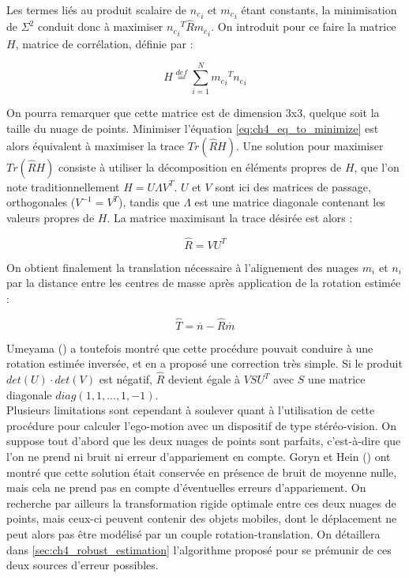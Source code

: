 Les termes liés au produit scalaire de ${n_c}_i$ et ${m_c}_i$ étant constants, la minimisation de $\Sigma^2$ conduit donc à maximiser ${{n_c}_i}^T \hat{R} {m_c}_i$. On introduit pour ce faire la matrice $H$, matrice de corrélation, définie par :

\begin{equation}
H \stackrel{def}{=} \sum\limits_{i=1}^{N} {{m_c}_i}^T {n_c}_i
\end{equation}

On pourra remarquer que cette matrice est de dimension 3x3, quelque soit la taille du nuage de points. Minimiser l'équation \ref{eq:ch4_eq_to_minimize} est alors équivalent à maximiser la trace $Tr(\hat{R} H)$. Une solution pour maximiser $Tr(\hat{R} H)$ consiste à utiliser la décomposition en éléments propres de $H$, que l'on note traditionnellement $H = U \Lambda V^T$. $U$ et $V$ sont ici des matrices de passage, orthogonales ($V^{-1} = V^T$), tandis que $\Lambda$ est une matrice diagonale contenant les valeurs propres de $H$. La matrice maximisant la trace désirée est alors :

\begin{equation}
\hat{R} = V U^T
\end{equation}

On obtient finalement la translation nécessaire à l'alignement des nuages $m_i$ et $n_i$ par la distance entre les centres de masse après application de la rotation estimée :

\begin{equation}
\hat{T} = \overline{n} - \hat{R} \overline{m}
\end{equation}

Umeyama (\cite{Umeyama1991}) a toutefois montré que cette procédure pouvait conduire à une rotation estimée inversée, et en a proposé une correction très simple. Si le produit $det(U) \cdot det(V)$ est négatif, $\hat{R}$ devient égale à $V S U^T$ avec $S$ une matrice diagonale $diag(1,1,..., 1, -1)$. \\

Plusieurs limitations sont cependant à soulever quant à l'utilisation de cette procédure pour calculer l’ego-motion avec un dispositif de type stéréo-vision. On suppose tout d'abord que les deux nuages de points sont \og parfaits\fg{}, c'est-à-dire que l'on ne prend ni bruit ni erreur d'appariement en compte. Goryn et Hein (\cite{Goryn1995}) ont montré que cette solution était conservée en présence de bruit de moyenne nulle, mais cela ne prend pas en compte d'éventuelles erreurs d'appariement. On recherche par ailleurs la transformation rigide optimale entre ces deux nuages de points, mais ceux-ci peuvent contenir des objets mobiles, dont le déplacement ne peut alors pas être modélisé par un couple rotation-translation. On détaillera dans \ref{sec:ch4_robust_estimation} l'algorithme proposé pour se prémunir de ces deux sources d'erreur possibles. 

